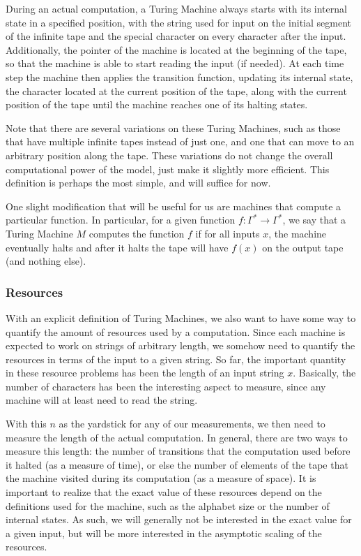 \documentclass[../thesis-main/thesis-main]{subfiles}
\begin{document}
During an actual computation, a Turing Machine always starts with its internal state in a specified position, with the string used for input on the initial segment of the infinite tape and the special character \textvisiblespace{}  on every character after the input.  Additionally, the pointer of the machine is located at the beginning of the tape, so that the machine is able to start reading the input (if needed).  At each time step the machine then applies the transition function, updating its internal state, the character located at the current position of the tape, along with the current position of the tape until the machine reaches one of its halting states.

Note that there are several variations on these Turing Machines, such as those that have multiple infinite tapes instead of just one, and one that can move to an arbitrary position along the tape.  These variations do not change the overall computational power of the model, just make it slightly more efficient.  This definition is perhaps the most simple, and will suffice for now.


One slight modification that will be useful for us are machines that compute a particular function.  In particular, for a given function $f:\Gamma^*\rightarrow \Gamma^*$, we say that a Turing Machine $M$ computes the function $f$ if for all inputs $x$, the machine eventually halts and after it halts the tape will have $f(x)$ on the output tape (and nothing else).

\subsubsection{Resources}

With an explicit definition of Turing Machines, we also want to have some way to quantify the amount of resources used by a computation.  Since each machine is expected to work on strings of arbitrary length, we somehow need to quantify the resources in terms of the input to a given string.    So far, the important quantity in these resource problems has been the length of an input string $x$.  Basically, the number of characters has been the interesting aspect to measure, since any machine will at least need to read the string.

With this $n$ as the yardstick for any of our measurements, we then need to measure the length of the actual computation.  In general, there are two ways to measure this length: the number of transitions that the computation used before it halted (as a measure of time), or else the number of elements of the tape that the machine visited during its computation (as a measure of space).  It is important to realize that the exact value of these resources depend on the definitions used for the machine, such as the alphabet size or the number of internal states.  As such, we will generally not be interested in the exact value for a given input, but will be more interested in the asymptotic scaling of the resources.
\end{document}
